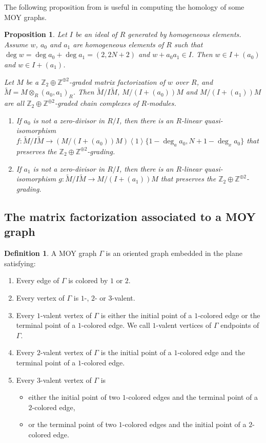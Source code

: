 \documentclass{amsart}
\theoremstyle{plain}
\newtheorem{proposition}[theorem]{Proposition}
\theoremstyle{definition}
\newtheorem{definition}[theorem]{Definition}
\theoremstyle{remark}
\numberwithin{equation}{section}
\begin{document}
The following proposition from \cite{KR1} is useful in computing the homology of some MOY graphs.

\begin{proposition}\cite[Proposition 10]{KR1}\label{prop-contraction-weak}
Let $I$ be an ideal of $R$ generated by homogeneous elements. Assume $w$, $a_0$ and $a_1$ are homogeneous elements of $R$ such that $\deg w=\deg a_0 +\deg a_1 = (2,2N+2)$ and $w+a_0a_1 \in I$. Then $w \in I+(a_0)$ and $w \in I+(a_1)$. 

Let $M$ be a ${\mathbb{Z}}_2\oplus{\mathbb{Z}}^{\oplus2}$-graded matrix factorization of $w$ over $R$, and $\widetilde{M}=M \otimes_R (a_0,a_1)_R$. Then ${\widetilde{M}/I\widetilde{M}}$, ${M/(I+(a_0))M}$ and ${M/(I+(a_1))M}$ are all ${\mathbb{Z}}_2 \oplus{\mathbb{Z}}^{\oplus2}$-graded chain complexes of $R$-modules.
\begin{enumerate}
	\item If $a_0$ is not a zero-divisor in $R/I$, then there is an $R$-linear quasi-isomorphism $f:{\widetilde{M}/I\widetilde{M}} \rightarrow {(M/(I+(a_0))M)\left\langle 1\right\rangle \{1-\deg_a a_0, N+1-\deg_x a_0 \}}$ that preserves the ${\mathbb{Z}}_2\oplus{\mathbb{Z}}^{\oplus 2}$-grading.
	\item If $a_1$ is not a zero-divisor in $R/I$, then there is an $R$-linear quasi-isomorphism $g:{\widetilde{M}/I\widetilde{M}} \rightarrow {M/(I+(a_1))M}$ that preserves the ${\mathbb{Z}}_2\oplus{\mathbb{Z}}^{\oplus 2}$-grading.
\end{enumerate}
\end{proposition}

\subsection{The matrix factorization associated to a MOY graph}

\begin{definition}\label{def-MOY}
A MOY graph $\Gamma$ is an oriented graph embedded in the plane satisfying:
\begin{enumerate}
	\item Every edge of $\Gamma$ is colored by $1$ or $2$.
	\item Every vertex of $\Gamma$ is $1$-, $2$- or $3$-valent.
	\item Every $1$-valent vertex of $\Gamma$ is either the initial point of a $1$-colored edge or the terminal point of a $1$-colored edge. We call $1$-valent vertices of $\Gamma$ endpoints of $\Gamma$.
	\item Every $2$-valent vertex of $\Gamma$ is the initial point of a $1$-colored edge and the terminal point of a $1$-colored edge.
	\item Every $3$-valent vertex of $\Gamma$ is 
  \begin{itemize}
		\item either the initial point of two $1$-colored edges and the terminal point of a $2$-colored edge,
		\item or the terminal point of two $1$-colored edges and the initial point of a $2$-colored edge.
	\end{itemize}
\end{enumerate}
\end{definition}
\end{document}
